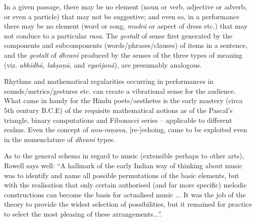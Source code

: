 In a given passage, there may be no element (noun or verb, adjective or adverb, or even a particle) that may not be suggestive; and even so, in a performance there may be no element (word or song, \textsl{mudrā} or aspect of dress etc.) that may not conduce to a particular \textsl{rasa}.
 The \textsl{gestalt} of sense first generated by the components and subcomponents (words/phrases/clauses) of items in a sentence, and the \textsl{gestalt} of \textsl{dhvani} produced by the senses of the three types of meaning (viz. \textsl{abhidhā, lakṣaṇā}, and \textsl{vyañjanā}), are presumably analogous.

Rhythms and mathematical regularities occurring in performances in sounds/metrics/gestures etc. can create a vibrational sense for the audience. What came in handy for the Hindu poets/aesthetes is the early mastery (circa 5th century B.C.E) of the requisite mathematical notions as of the Pascal’s triangle, binary computations and Fibonacci series -- applicable to different realms. Even the concept of \textsl{anu-raṇana}, [re-]echoing, came to be exploited even in the nomenclature of \textsl{dhvani} types. 

As to the general schema in regard to music (extensible perhaps to other arts), Rowell says well: “A hallmark of the early Indian way of thinking about music was to identify and name all possible permutations of the basic elements, but with the realisation that only certain authorised (and far more specific) melodic constructions can become the basis for actualised music ... It was the job of the theory to provide the widest selection of possibilities, but it remained for practice to select the most pleasing of these arrangements...”.


